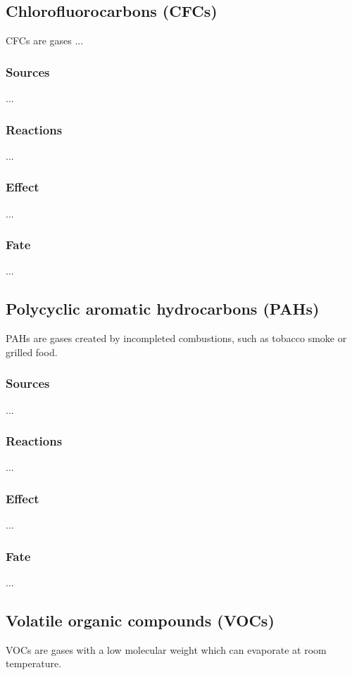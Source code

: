 \documentclass{article}
\begin{document}
\subsection{Chlorofluorocarbons (CFCs)}
CFCs are gases ...

\subsubsection{Sources}
...

\subsubsection{Reactions}
...

\subsubsection{Effect}
...

\subsubsection{Fate}
... 

\subsection{Polycyclic aromatic hydrocarbons (PAHs)}
PAHs are gases created by incompleted combustions, such as tobacco smoke
or grilled food.

\subsubsection{Sources}
...

\subsubsection{Reactions}
...

\subsubsection{Effect}
...

\subsubsection{Fate}
... 

\subsection{Volatile organic compounds (VOCs)}
VOCs are gases with a low molecular weight which can evaporate at room temperature.
\end{document}
